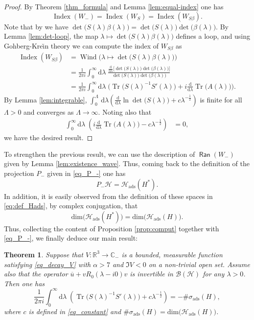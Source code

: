 \documentclass{article}
\def\B{\mathscr B}
\def\C{\mathbb C}
\def\d{\mathrm{d}}
\def\H{\mathcal H}
\def\R{\mathbb R}
\def\Ran{\mathop{\mathsf{Ran}}\nolimits}
\def\index{\mathop{\mathrm{Index}}\nolimits}
\def\dim{\mathop{\mathrm{dim}}\nolimits}
\def\Tr{\mathop{\mathrm{Tr}}\nolimits}
\def\wind{\mathop{\mathrm{Wind}}\nolimits}
\def\dim{{\mathrm{dim}}}
\def\ads{{\mathrm{ads}}}
\newtheorem{Theorem}{Theorem}[section]
\begin{document}
\begin{proof}
By Theorem \ref{thm_formula} and Lemma \ref{lem:equal-index} one has 
$$
\index(W_-)=
\index(W_S) = \index(W_{S\beta}).
$$ 
Note that by \cite[Thm.~3.5(a)]{simon} we have $\det\big(S(\lambda)\beta(\lambda)\big) = \det\big(S(\lambda)\big) \det\big(\beta(\lambda)\big)$. By Lemma \ref{lem:det-loop}, the map $\lambda \mapsto \det\big(S(\lambda)\beta(\lambda)\big)$ defines a loop, and using Gohberg-Kre\u{\i}n theory we can compute the index of $W_{S\beta}$ as
\begin{align*}
\index(W_{S\beta}) &= \wind\Big(\lambda\mapsto \det\big(S(\lambda)\beta(\lambda)\big)\Big) \\
&= \frac{1}{2\pi i} \int_0^\infty \d \lambda\;\! \frac{\frac{\d}{\d \lambda}\big[ \det\big(S(\lambda)\big) \det\big(\beta(\lambda)\big)\big]}{\det\big(S(\lambda)\big) \det\big(\beta(\lambda)\big)}  \\
&= \frac{1}{2\pi i} \int_0^\infty \d \lambda \;\!\Big( \Tr\big(S(\lambda)^{-1}S'(\lambda)\big) +i \frac{\d}{\d \lambda}\Tr\big(A(\lambda)\big) \Big).
\end{align*}
By Lemma \ref{lem:integrable}, $\int_0^\Lambda \, \d \lambda \left( \frac{\d}{\d \lambda} \ln\det\big(S(\lambda)\big) + c \lambda^{-\frac12} \right)$ is finite for all $\Lambda > 0$ and converges as $\Lambda \to \infty$. Noting also that 
\begin{align*}
\int_0^\infty\d \lambda\;\! \left( i \frac{\d}{\d \lambda}\Tr\big(A(\lambda)\big) - c \lambda^{-\frac12} \right)  &= 0,
\end{align*}
we have the desired result.
\end{proof}

To strengthen the previous result, we can use the description of $\Ran(W_-)$ given by Lemma \ref{lem:existence_wave}. Thus, coming back to the definition of the projection $P_-$ given in \eqref{eq_P_-} one has
\begin{equation*}
P_-\H = \H_\ads(H^*).
\end{equation*}
In addition, it is easily observed from the definition of these spaces in \eqref{eq:def_Hads}, by complex conjugation,
that 
$$
\dim\big(\H_\ads(H^*)\big) = \dim\big(\H_\ads(H)\big).
$$
Thus, collecting the content of Proposition \ref{prop:comput} together with \eqref{eq_P_-}, we finally deduce
our main result:

\begin{Theorem}\label{thm:analytic-formula}
Suppose that $V:\R^3\to \C_-$ is a bounded, measurable function satisfying \eqref{eq_decay_V} with $\alpha>7$ and $\Im V<0$ on a non-trivial open set.
Assume also that the operator $\overline{u} + vR_0(\lambda-i0)v$ is invertible in $\B(\H)$ for any $\lambda > 0$. Then one has
\begin{equation*}
\frac{1}{2\pi i} \int_0^\infty \d\lambda \;\! \left( \Tr\big(S(\lambda)^{-1}S'(\lambda)\big)+ c \lambda^{-\frac12} \right)   =  - \#\sigma_\ads(H) ,
\end{equation*}
where $c$ is defined in \eqref{eq_constant} and  $\#\sigma_\ads(H) = \dim\big(\H_\ads(H)\big)$.
\end{Theorem}
\end{document}
